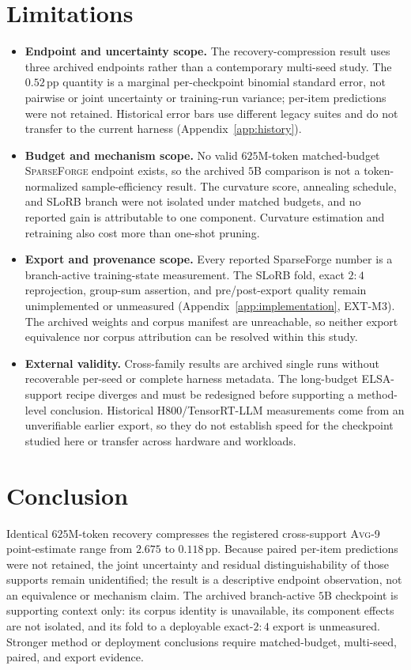 \documentclass{article}
\newcommand{\method}{\textsc{SparseForge}}
\newcommand{\taskavg}{\textsc{Avg}-9}
\begin{document}
\section{Limitations}\label{sec:limitations}
\begin{itemize}
\item \textbf{Endpoint and uncertainty scope.} The recovery-compression result uses three archived
endpoints rather than a contemporary multi-seed study. The $0.52$\,pp quantity is a marginal
per-checkpoint binomial standard error, not pairwise or joint uncertainty or training-run variance;
per-item predictions were not retained. Historical error bars use different legacy suites and do
not transfer to the current harness (Appendix~\ref{app:history}).
\item \textbf{Budget and mechanism scope.} No valid $625$M-token matched-budget \method{} endpoint
exists, so the archived $5$B comparison is not a token-normalized sample-efficiency result. The
curvature score, annealing schedule, and SLoRB branch were not isolated under matched budgets, and
no reported gain is attributable to one component. Curvature estimation and retraining also cost
more than one-shot pruning.
\item \textbf{Export and provenance scope.} Every reported SparseForge number is a branch-active
training-state measurement. The SLoRB fold, exact $2{:}4$ reprojection, group-sum assertion, and
pre/post-export quality remain unimplemented or unmeasured (Appendix~\ref{app:implementation},
EXT-M3). The archived weights and corpus manifest are unreachable, so neither export equivalence nor
corpus attribution can be resolved within this study.
\item \textbf{External validity.} Cross-family results are archived single runs without recoverable
per-seed or complete harness metadata. The long-budget ELSA-support recipe diverges and must be
redesigned before supporting a method-level conclusion. Historical H800/TensorRT-LLM measurements
come from an unverifiable earlier export, so they do not establish speed for the checkpoint studied
here or transfer across hardware and workloads.
\end{itemize}

\section{Conclusion}\label{sec:conclusion}
Identical $625$M-token recovery compresses the registered cross-support \taskavg{} point-estimate
range from $2.675$ to $0.118$\,pp. Because paired per-item predictions were not retained, the joint
uncertainty and residual distinguishability of those supports remain unidentified; the result is a
descriptive endpoint observation, not an equivalence or mechanism claim. The archived branch-active
$5$B checkpoint is supporting context only: its corpus identity is unavailable, its component
effects are not isolated, and its fold to a deployable exact-$2{:}4$ export is unmeasured. Stronger
method or deployment conclusions require matched-budget, multi-seed, paired, and export evidence.
\end{document}
